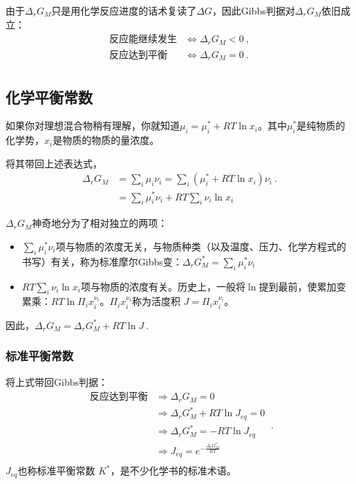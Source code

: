 由于$\Delta_r G_M$只是用化学反应进度的话术复读了$\Delta G$，因此Gibbs判据对$\Delta_r G_M$依旧成立：
$$
\begin{aligned}
\text{反应能继续发生} &\Longleftrightarrow \Delta_r G_M < 0~,\\
\text{反应达到平衡} &\Longleftrightarrow \Delta_r G_M = 0~.\\
\end{aligned}
$$

\subsection{化学平衡常数}
如果你对理想混合物稍有理解，你就知道$\mu_i = \mu_i^* + RT \ln x_i$。其中$\mu_i^*$是纯物质的化学势，$x_i$是物质的物质的量浓度。

将其带回上述表达式，
$$
\begin{aligned}
\Delta_r G_M &= \sum_i \mu_i \nu_i = \sum_i (\mu_i^* + RT \ln x_i) \nu_i ~.\\
&= \sum_i \mu_i^* \nu_i + RT \sum_i \nu_i \ln x_i
\end{aligned}
$$

$\Delta_r G_M$神奇地分为了相对独立的两项：
\begin{itemize}
\item $\sum_i \mu_i^* \nu_i$项与物质的浓度无关，与物质种类（以及温度、压力、化学方程式的书写）有关，称为标准摩尔Gibbs变：$\Delta_r G_M^* = \sum_i \mu_i^* \nu_i$
\item $RT \sum_i \nu_i \ln x_i$项与物质的浓度有关。历史上，一般将$\ln$提到最前，使累加变累乘：$RT \ln \Pi_i x_i^{\nu_i}$。$\Pi_i x_i^{\nu_i}$称为活度积 $J=\Pi_i x_i^{\nu_i}$。
\end{itemize}
因此，$\Delta_r G_M = \Delta_r G_M^* + RT \ln J~.$

\subsubsection{标准平衡常数}
将上式带回Gibbs判据：
$$
\begin{aligned}
\text{反应达到平衡} &\Rightarrow \Delta_r G_M = 0\\
&\Rightarrow \Delta_r G_M^* + RT \ln J_{eq} = 0\\
&\Rightarrow \Delta_r G_M^* = - RT \ln J_{eq}\\
&\Rightarrow J_{eq} = e^{-\frac{\Delta_r G_M^*}{RT}}\\
\end{aligned}~.
$$
$J_{eq}$也称标准平衡常数 $K^*$，是不少化学书的标准术语。

